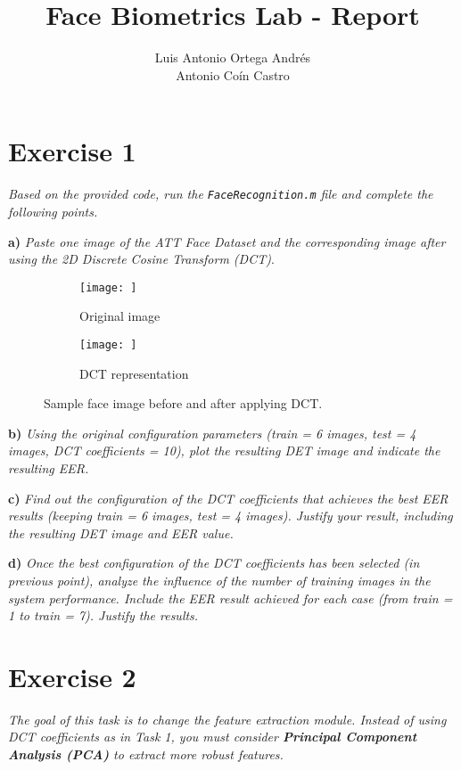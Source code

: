 \documentclass[11pt]{article}
\author{Luis Antonio Ortega Andrés\\Antonio Coín Castro}
\date{}
\title{Face Biometrics Lab - Report}
\begin{document}
\maketitle

\section*{Exercise 1}

\textit{Based on the provided code, run the \texttt{FaceRecognition.m} file and complete the following points.}

\textbf{a)} \emph{Paste one image of the ATT Face Dataset and the corresponding image after using the 2D Discrete Cosine Transform (DCT)}.

\begin{figure}[h!]
  \centering
       \begin{subfigure}[t]{0.45\textwidth}
         \centering
         \texttt{[image: ]}
         \caption{Original image}
     \end{subfigure}%
     \quad
     \begin{subfigure}[t]{0.45\textwidth}
         \centering
         \texttt{[image: ]}
         \caption{DCT representation}
     \end{subfigure}
    \caption{Sample face image before and after applying DCT.}
    \label{fig:ex1a}
\end{figure}

\textbf{b)} \emph{Using the original configuration parameters (train = 6 images, test = 4 images, DCT coefficients = 10), plot the resulting DET image and indicate the resulting EER.}

\textbf{c)} \emph{Find out the configuration of the DCT coefficients that achieves the best EER results (keeping train = 6 images, test = 4 images). Justify your result, including the resulting DET image and EER value.}

\textbf{d)} \textit{Once the best configuration of the DCT coefficients has been selected (in previous point), analyze the influence of the number of training images in the system performance. Include the EER result achieved for each case (from train = 1 to train = 7). Justify the results.}

\section*{Exercise 2}

\textit{The goal of this task is to change the feature extraction module. Instead of using DCT coefficients as in Task 1, you must consider \textbf{Principal Component Analysis (PCA)} to extract more robust features.}
\end{document}
